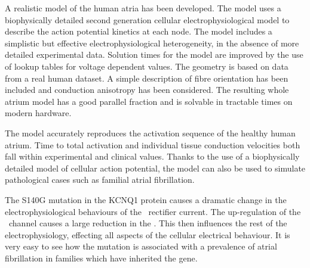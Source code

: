 A realistic model of the human atria has been developed.
The model uses a biophysically detailed second generation cellular
electrophysiological model to describe the action potential kinetics at each node.
The model includes a simplistic but effective electrophysiological
heterogeneity, in the absence of more detailed experimental data.
Solution times for the model are improved by the use of lookup tables for
voltage dependent values.
The geometry is based on data from a real human dataset.
A simple description of fibre orientation has been included and conduction
anisotropy has been considered.
The resulting whole atrium model has a good parallel fraction and is solvable in
tractable times on modern hardware.

The model accurately reproduces the activation sequence of the healthy human
atrium.
Time to total activation and individual tissue conduction velocities both fall
within experimental and clinical values.
Thanks to the use of a biophysically detailed model of cellular action
potential, the model can also be used to simulate pathological cases such as
familial atrial fibrillation.

The S140G mutation in the KCNQ1 protein causes a dramatic change in the
electrophysiological behaviours of the \ rectifier current.
The up-regulation of the \ channel causes a large reduction in the \apd.
This then influences the rest of the electrophysiology, effecting all aspects of
the cellular electrical behaviour.
It is very easy to see how the mutation is associated with a prevalence of
atrial fibrillation in families which have inherited the gene.

